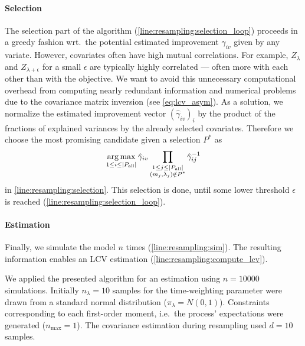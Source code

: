 \paragraph{Selection} The selection part of the algorithm (\autoref{line:resampling:selection_loop}) proceeds in a greedy fashion wrt.\ the potential estimated improvement $\hat{\gamma}_{iv}$ given by any variate.
However, covariates often have high mutual correlations.
For example, $Z_{\lambda}$ and $Z_{\lambda+\epsilon}$ for a small $\epsilon$ are typically highly correlated --- often more with each other than with the objective.
We want to avoid this unnecessary computational overhead from computing nearly redundant information and numerical problems due to the covariance matrix inversion (see \eqref{eq:lcv_asym}).
As a solution, we normalize the estimated improvement vector $(\hat{\gamma}_{iv})_i$ by
the product of the fractions of explained variances by the already selected covariates.
Therefore we choose the most promising candidate given a selection $P^{*}$ as
\begin{equation}
\operatorname*{arg\,max}_{1\leq i \leq \left|P_{\text{all}}\right|}
\hat{\gamma}_{iv}
    \prod_{\substack{1\leq j\leq {\left|P_{\text{all}}\right|}\\(m_j, \lambda_j)\notin P^*}}
    \hat{\gamma}_{ij}^{-1}
\end{equation}
in \autoref{line:resampling:selection}.
This selection is done, until some lower threshold $\epsilon$ is reached (\autoref{line:resampling:selection_loop}).

\paragraph{Estimation} Finally, we simulate the model $n$ times (\autoref{line:resampling:sim}).
The resulting information enables an LCV estimation (\autoref{line:resampling:compute_lcv}).


We applied the presented algorithm for an estimation using $n=\num{10000}$ simulations.
Initially $n_{\lambda}=10$ samples for the time-weighting parameter were drawn from a standard normal distribution ($\pi_{\lambda} = N(0,1)$).
Constraints corresponding to each first-order moment, i.e.\ the process' expectations were generated ($n_{\max}=1$).
The covariance estimation during resampling used $d=10$ samples.

